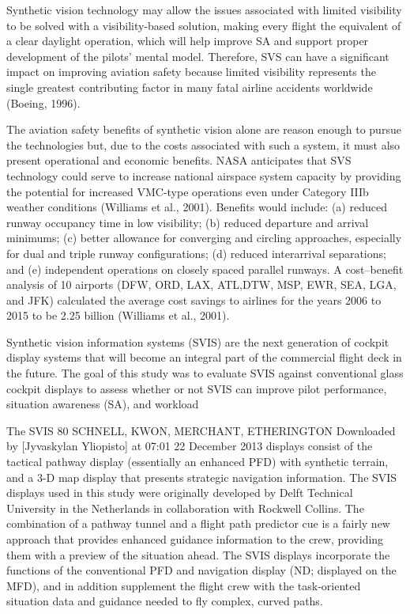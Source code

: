 \documentclass[utf8,bachelor,manualbib]{gradu3}
\begin{document}
Synthetic vision technology may allow the issues associated with limited visibility
to be solved with a visibility-based solution, making every flight the equivalent of
a clear daylight operation, which will help improve SA and support proper development
of the pilots’ mental model. Therefore, SVS can have a significant impact
on improving aviation safety because limited visibility represents the single greatest
contributing factor in many fatal airline accidents worldwide (Boeing, 1996).\citep{prinzel2004}

The aviation safety benefits of synthetic vision alone are reason enough to pursue
the technologies but, due to the costs associated with such a system, it must also
present operational and economic benefits. NASA anticipates that SVS technology
could serve to increase national airspace system capacity by providing the potential
for increased VMC-type operations even under Category IIIb weather conditions
(Williams et al., 2001). Benefits would include: (a) reduced runway
occupancy time in low visibility; (b) reduced departure and arrival minimums; (c)
better allowance for converging and circling approaches, especially for dual and
triple runway configurations; (d) reduced interarrival separations; and (e) independent
operations on closely spaced parallel runways. A cost–benefit analysis of
10 airports (DFW, ORD, LAX, ATL,DTW, MSP, EWR, SEA, LGA, and JFK) calculated
the average cost savings to airlines for the years 2006 to 2015 to be 2.25
billion (Williams et al., 2001). \citep{prinzel2004}

Synthetic vision information systems (SVIS) are the next generation of cockpit display
systems that will become an integral part of the commercial flight deck in the future.
The goal of this study was to evaluate SVIS against conventional glass cockpit
displays to assess whether or not SVIS can improve pilot performance, situation
awareness (SA), and workload \citep{schnell2004}

The SVIS
80 SCHNELL, KWON, MERCHANT, ETHERINGTON
Downloaded by [Jyvaskylan Yliopisto] at 07:01 22 December 2013
displays consist of the tactical pathway display (essentially an enhanced PFD)
with synthetic terrain, and a 3-D map display that presents strategic navigation information.
The SVIS displays used in this study were originally developed by
Delft Technical University in the Netherlands in collaboration with Rockwell Collins.
The combination of a pathway tunnel and a flight path predictor cue is a fairly
new approach that provides enhanced guidance information to the crew, providing
them with a preview of the situation ahead. The SVIS displays incorporate the
functions of the conventional PFD and navigation display (ND; displayed on the
MFD), and in addition supplement the flight crew with the task-oriented situation
data and guidance needed to fly complex, curved paths. \citep{schnell2004}
\end{document}
